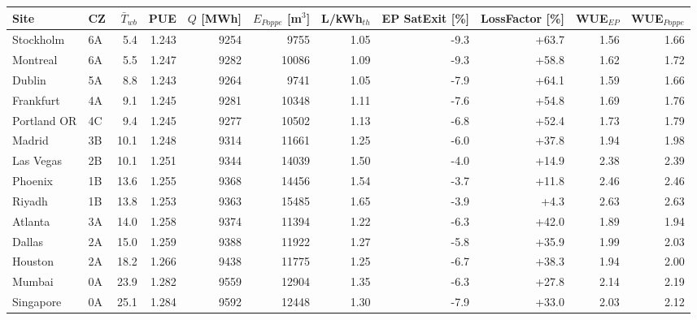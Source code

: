 \begin{tabular}{llrrrrrrrrr}
\toprule
Site & CZ & $\bar T_{wb}$ & PUE & $Q$ [MWh] & $E_{Poppe}$ [m$^3$] & L/kWh$_{th}$ & EP SatExit [\%] & LossFactor [\%] & WUE$_{EP}$ & WUE$_{Poppe}$ \\
\midrule
Stockholm & 6A & 5.4 & 1.243 & 9254 & 9755 & 1.05 & -9.3 & +63.7 & 1.56 & 1.66 \\
Montreal & 6A & 5.5 & 1.247 & 9282 & 10086 & 1.09 & -9.3 & +58.8 & 1.62 & 1.72 \\
Dublin & 5A & 8.8 & 1.243 & 9264 & 9741 & 1.05 & -7.9 & +64.1 & 1.59 & 1.66 \\
Frankfurt & 4A & 9.1 & 1.245 & 9281 & 10348 & 1.11 & -7.6 & +54.8 & 1.69 & 1.76 \\
Portland OR & 4C & 9.4 & 1.245 & 9277 & 10502 & 1.13 & -6.8 & +52.4 & 1.73 & 1.79 \\
Madrid & 3B & 10.1 & 1.248 & 9314 & 11661 & 1.25 & -6.0 & +37.8 & 1.94 & 1.98 \\
Las Vegas & 2B & 10.1 & 1.251 & 9344 & 14039 & 1.50 & -4.0 & +14.9 & 2.38 & 2.39 \\
Phoenix & 1B & 13.6 & 1.255 & 9368 & 14456 & 1.54 & -3.7 & +11.8 & 2.46 & 2.46 \\
Riyadh & 1B & 13.8 & 1.253 & 9363 & 15485 & 1.65 & -3.9 & +4.3 & 2.63 & 2.63 \\
Atlanta & 3A & 14.0 & 1.258 & 9374 & 11394 & 1.22 & -6.3 & +42.0 & 1.89 & 1.94 \\
Dallas & 2A & 15.0 & 1.259 & 9388 & 11922 & 1.27 & -5.8 & +35.9 & 1.99 & 2.03 \\
Houston & 2A & 18.2 & 1.266 & 9438 & 11775 & 1.25 & -6.7 & +38.3 & 1.94 & 2.00 \\
Mumbai & 0A & 23.9 & 1.282 & 9559 & 12904 & 1.35 & -6.3 & +27.8 & 2.14 & 2.19 \\
Singapore & 0A & 25.1 & 1.284 & 9592 & 12448 & 1.30 & -7.9 & +33.0 & 2.03 & 2.12 \\
\bottomrule
\end{tabular}
